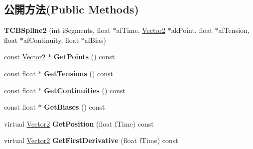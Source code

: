 \subsection*{公開方法(Public Methods)}
\begin{DoxyCompactItemize}
\item 
{\bfseries T\+C\+B\+Spline2} (int i\+Segments, float $\ast$af\+Time, \hyperlink{class_i_dream_sky_1_1_vector2}{Vector2} $\ast$ak\+Point, float $\ast$af\+Tension, float $\ast$af\+Continuity, float $\ast$af\+Bias)\hypertarget{class_i_dream_sky_1_1_t_c_b_spline2_a99f6f86ae9829c2417c2df5cb72abd46}{}\label{class_i_dream_sky_1_1_t_c_b_spline2_a99f6f86ae9829c2417c2df5cb72abd46}

\item 
const \hyperlink{class_i_dream_sky_1_1_vector2}{Vector2} $\ast$ {\bfseries Get\+Points} () const \hypertarget{class_i_dream_sky_1_1_t_c_b_spline2_a77c6cc549dbf351dce562847694c4e92}{}\label{class_i_dream_sky_1_1_t_c_b_spline2_a77c6cc549dbf351dce562847694c4e92}

\item 
const float $\ast$ {\bfseries Get\+Tensions} () const \hypertarget{class_i_dream_sky_1_1_t_c_b_spline2_ae19ddb819531be54320e4f2176d6f87a}{}\label{class_i_dream_sky_1_1_t_c_b_spline2_ae19ddb819531be54320e4f2176d6f87a}

\item 
const float $\ast$ {\bfseries Get\+Continuities} () const \hypertarget{class_i_dream_sky_1_1_t_c_b_spline2_ab99c0b27e52ca7489a8d9a40ff25e78b}{}\label{class_i_dream_sky_1_1_t_c_b_spline2_ab99c0b27e52ca7489a8d9a40ff25e78b}

\item 
const float $\ast$ {\bfseries Get\+Biases} () const \hypertarget{class_i_dream_sky_1_1_t_c_b_spline2_aadeb8dca78a97966dd9e4bcd90f4f9c0}{}\label{class_i_dream_sky_1_1_t_c_b_spline2_aadeb8dca78a97966dd9e4bcd90f4f9c0}

\item 
virtual \hyperlink{class_i_dream_sky_1_1_vector2}{Vector2} {\bfseries Get\+Position} (float f\+Time) const \hypertarget{class_i_dream_sky_1_1_t_c_b_spline2_a82bc6f7ecb210dbcae10c414aa58a362}{}\label{class_i_dream_sky_1_1_t_c_b_spline2_a82bc6f7ecb210dbcae10c414aa58a362}

\item 
virtual \hyperlink{class_i_dream_sky_1_1_vector2}{Vector2} {\bfseries Get\+First\+Derivative} (float f\+Time) const \hypertarget{class_i_dream_sky_1_1_t_c_b_spline2_af925791e5c93dab5e7592c1bc21566b4}{}\label{class_i_dream_sky_1_1_t_c_b_spline2_af925791e5c93dab5e7592c1bc21566b4}


\end{DoxyCompactItemize}
